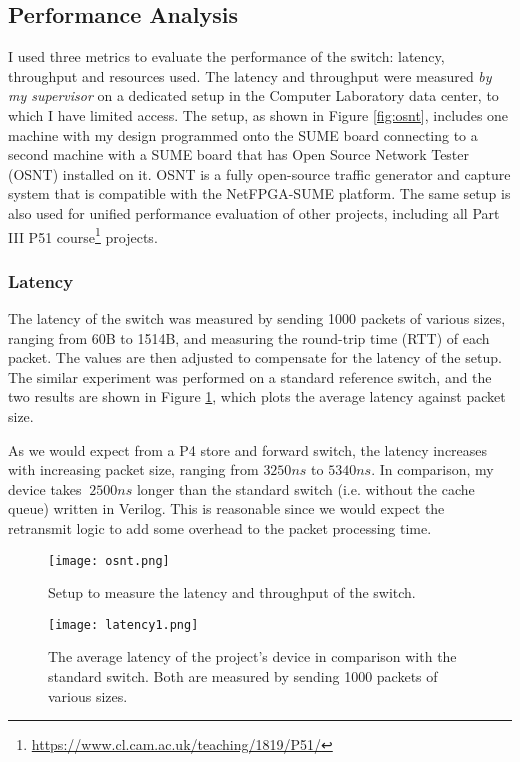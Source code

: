 \subsection{Performance Analysis}
\label{sec:perf}
I used three metrics to evaluate the performance of the switch: latency, throughput and resources used. The latency and throughput were measured \textit{by my supervisor} on a dedicated setup in the Computer Laboratory data center, to which I have limited access. The setup, as shown in Figure \ref{fig:osnt}, includes one machine with my design programmed onto the SUME board connecting to a second machine with a SUME board that has Open Source Network Tester \cite{osntpdf, osnt} (OSNT) installed on it. OSNT is a fully open-source traffic generator and capture system that is compatible with the NetFPGA-SUME platform. The same setup is also used for unified performance evaluation of other projects, including all Part III P51 course\footnote{\url{https://www.cl.cam.ac.uk/teaching/1819/P51/}} projects.

\subsubsection{Latency}
The latency of the switch was measured by sending 1000 packets of various sizes, ranging from 60B to 1514B, and measuring the round-trip time (RTT) of each packet. The values are then adjusted to compensate for the latency of the setup. The similar experiment was performed on a standard reference switch, and the two results are shown in Figure \ref{fig:latency1}, which plots the average latency against packet size.

As we would expect from a P4 store and forward switch, the latency increases with increasing packet size, ranging from $3250 ns$ to $5340 ns$. In comparison, my device takes $~2500 ns$ longer than the standard switch (i.e. without the cache queue) written in Verilog. This is reasonable since we would expect the retransmit logic to add some overhead to the packet processing time.

\begin{figure}[!h]
	\begin{minipage}{.48\textwidth}
		\centering
		\texttt{[image: osnt.png]}
		\caption{Setup to measure the latency and throughput of the switch.}
		\label{fig:osnt}
	\end{minipage}
	\hfill
	\begin{minipage}{.48\textwidth}
		\centering
		\texttt{[image: latency1.png]}
		\caption{The average latency of the project's device in comparison with the standard switch. Both are measured by sending 1000 packets of various sizes.}
		\label{fig:latency1}
	\end{minipage}
\end{figure}

